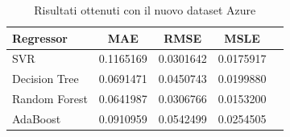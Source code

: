 \begin{table}[H]
    \centering
    \begin{tabular}{|>{\centering\arraybackslash}m{5cm}|c|c|c|c|}
        \hline
        \textbf{Regressor} & \textbf{MAE} & \textbf{RMSE} & \textbf{MSLE} \\ [10pt]
        \hline
        SVR & 0.1165169 & 0.0301642 & 0.0175917 \\ [10pt]
        \hline
        Decision Tree & 0.0691471 & 0.0450743 & 0.0199880 \\ [10pt]
        \hline
        Random Forest & 0.0641987 & 0.0306766 & 0.0153200 \\ [10pt]
        \hline
        AdaBoost & 0.0910959 & 0.0542499 & 0.0254505 \\ [10pt]
        \hline
    \end{tabular}
    \caption{Risultati ottenuti con il nuovo dataset Azure}
    \label{tab:results}
\end{table}

